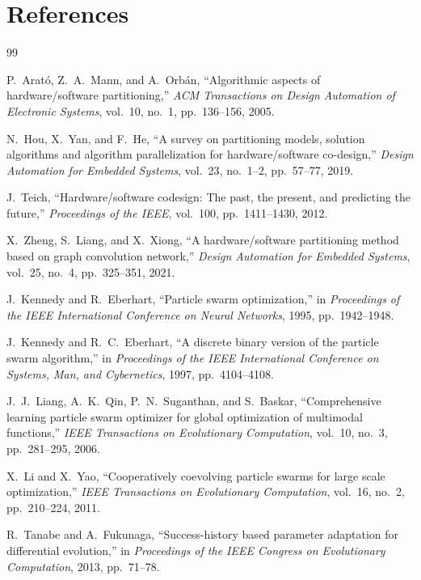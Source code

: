 \section*{References}
\begin{thebibliography}{99}

P.~Arat\'o, Z.~A.~Mann, and A.~Orb\'an,
``Algorithmic aspects of hardware/software partitioning,''
\emph{ACM Transactions on Design Automation of Electronic Systems},
vol.~10, no.~1, pp.~136--156, 2005.

N.~Hou, X.~Yan, and F.~He,
``A survey on partitioning models, solution algorithms and algorithm parallelization for hardware/software co-design,''
\emph{Design Automation for Embedded Systems},
vol.~23, no.~1--2, pp.~57--77, 2019.

J.~Teich,
``Hardware/software codesign: The past, the present, and predicting the future,''
\emph{Proceedings of the IEEE},
vol.~100, pp.~1411--1430, 2012.

X.~Zheng, S.~Liang, and X.~Xiong,
``A hardware/software partitioning method based on graph convolution network,''
\emph{Design Automation for Embedded Systems},
vol.~25, no.~4, pp.~325--351, 2021.

J.~Kennedy and R.~Eberhart,
``Particle swarm optimization,''
in \emph{Proceedings of the IEEE International Conference on Neural Networks}, 1995, pp.~1942--1948.

J.~Kennedy and R.~C.~Eberhart,
``A discrete binary version of the particle swarm algorithm,''
in \emph{Proceedings of the IEEE International Conference on Systems, Man, and Cybernetics}, 1997, pp.~4104--4108.

J.~J.~Liang, A.~K.~Qin, P.~N.~Suganthan, and S.~Baskar,
``Comprehensive learning particle swarm optimizer for global optimization of multimodal functions,''
\emph{IEEE Transactions on Evolutionary Computation},
vol.~10, no.~3, pp.~281--295, 2006.

X.~Li and X.~Yao,
``Cooperatively coevolving particle swarms for large scale optimization,''
\emph{IEEE Transactions on Evolutionary Computation},
vol.~16, no.~2, pp.~210--224, 2011.

R.~Tanabe and A.~Fukunaga,
``Success-history based parameter adaptation for differential evolution,''
in \emph{Proceedings of the IEEE Congress on Evolutionary Computation}, 2013, pp.~71--78.


\end{thebibliography}
